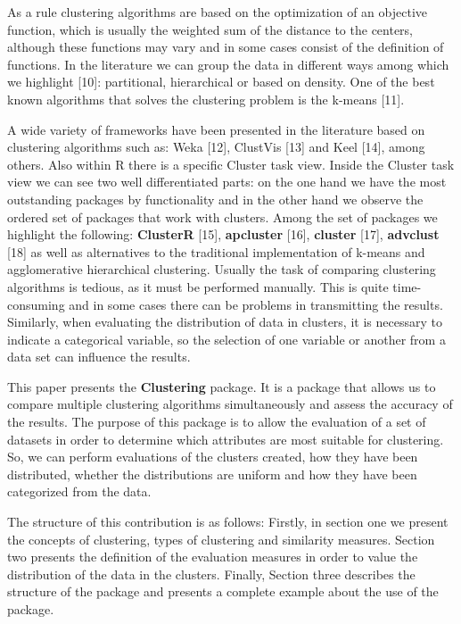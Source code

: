\documentclass[
]{article}
\begin{document}
As a rule clustering algorithms are based on the optimization of an
objective function, which is usually the weighted sum of the distance to
the centers, although these functions may vary and in some cases consist
of the definition of functions. In the literature we can group the data
in different ways among which we highlight {[}10{]}: partitional,
hierarchical or based on density. One of the best known algorithms that
solves the clustering problem is the k-means {[}11{]}.

A wide variety of frameworks have been presented in the literature based
on clustering algorithms such as: Weka {[}12{]}, ClustVis {[}13{]} and
Keel {[}14{]}, among others. Also within R there is a specific Cluster
task view. Inside the Cluster task view we can see two well
differentiated parts: on the one hand we have the most outstanding
packages by functionality and in the other hand we observe the ordered
set of packages that work with clusters. Among the set of packages we
highlight the following: \textbf{ClusterR} {[}15{]}, \textbf{apcluster}
{[}16{]}, \textbf{cluster} {[}17{]}, \textbf{advclust} {[}18{]} as well
as alternatives to the traditional implementation of k-means and
agglomerative hierarchical clustering. Usually the task of comparing
clustering algorithms is tedious, as it must be performed manually. This
is quite time-consuming and in some cases there can be problems in
transmitting the results. Similarly, when evaluating the distribution of
data in clusters, it is necessary to indicate a categorical variable, so
the selection of one variable or another from a data set can influence
the results.

This paper presents the \textbf{Clustering} package. It is a package
that allows us to compare multiple clustering algorithms simultaneously
and assess the accuracy of the results. The purpose of this package is
to allow the evaluation of a set of datasets in order to determine which
attributes are most suitable for clustering. So, we can perform
evaluations of the clusters created, how they have been distributed,
whether the distributions are uniform and how they have been categorized
from the data.

The structure of this contribution is as follows: Firstly, in section
one  we present the concepts of clustering,
types of clustering and similarity measures. Section two
 presents the definition of the evaluation
measures in order to value the distribution of the data in the clusters.
Finally, Section three describes the structure of
the package and presents a complete example about the use of the
package.
\end{document}
